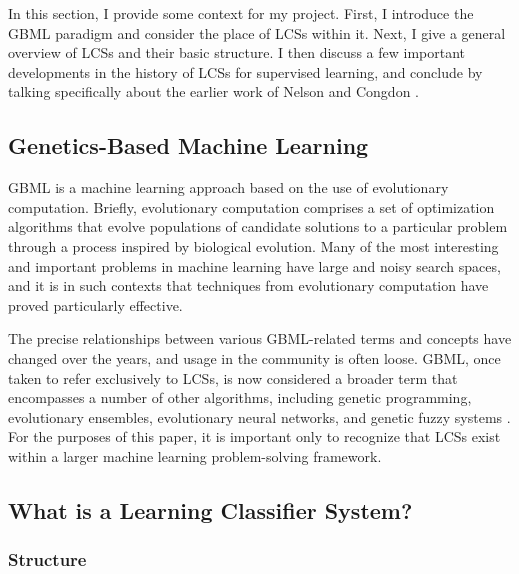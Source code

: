 \documentclass[12pt]{article}
\begin{document}
In this section, I provide some context for my project. First, I introduce the GBML paradigm and consider the place of LCSs within it. Next, I give a general overview of LCSs and their basic structure. I then discuss a few important developments in the history of LCSs for supervised learning, and conclude by talking specifically about the earlier work of Nelson and Congdon \cite{nelson_measuring_2016}.

\subsection{Genetics-Based Machine Learning}

GBML is a machine learning approach based on the use of evolutionary computation. Briefly, evolutionary computation comprises a set of optimization algorithms that evolve populations of candidate solutions to a particular problem through a process inspired by biological evolution. Many of the most interesting and important problems in machine learning have large and noisy search spaces, and it is in such contexts that techniques from evolutionary computation have proved particularly effective.

The precise relationships between various GBML-related terms and concepts have changed over the years, and usage in the community is often loose. GBML, once taken to refer exclusively to LCSs, is now considered a broader term that encompasses a number of other algorithms, including genetic programming, evolutionary ensembles, evolutionary neural networks, and genetic fuzzy systems \cite{kovacs_genetics-based_2012}. For the purposes of this paper, it is important only to recognize that LCSs exist within a larger machine learning problem-solving framework.

\subsection{What is a Learning Classifier System?}

\subsubsection{Structure}
\end{document}
